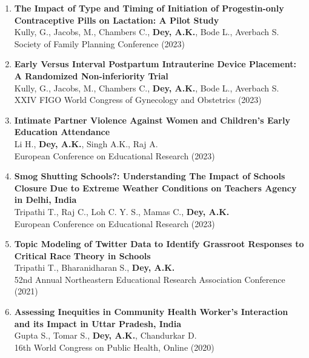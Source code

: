 \documentclass[13pt,letterpaper]{article}
\begin{document}
\begin{enumerate}
\item \textbf{The Impact of Type and Timing of Initiation of Progestin-only Contraceptive Pills on Lactation: A Pilot Study}\\
Kully, G., Jacobs, M., Chambers C., \textbf{Dey, A.K.}, Bode L., Averbach S.\\
Society of Family Planning Conference (2023) 

\item \textbf{Early Versus Interval Postpartum Intrauterine Device Placement: A Randomized Non-inferiority Trial}\\
Kully, G., Jacobs, M., Chambers C., \textbf{Dey, A.K.}, Bode L., Averbach S.\\
XXIV FIGO World Congress of Gynecology and Obstetrics (2023) 

\item \textbf{Intimate Partner Violence Against Women and Children's Early Education Attendance}\\
Li H., \textbf{Dey, A.K.}, Singh A.K., Raj A.\\
European Conference on Educational Research (2023) 

\item \textbf{Smog Shutting Schools?: Understanding The Impact of Schools Closure Due to Extreme Weather Conditions on Teachers Agency in Delhi, India}\\
Tripathi T., Raj C., Loh C. Y. S., Mamas C., \textbf{Dey, A.K.}\\
European Conference on Educational Research (2023) 

\item \textbf{Topic Modeling of Twitter Data to Identify Grassroot Responses to Critical Race Theory in Schools}\\
Tripathi T., Bharanidharan S., \textbf{Dey, A.K.}\\
52nd Annual Northeastern Educational Research Association Conference (2021) 

\item \textbf{Assessing Inequities in Community Health Worker's Interaction and its Impact in Uttar Pradesh, India}\\
Gupta S., Tomar S., \textbf{Dey, A.K.}, Chandurkar D.\\
16th World Congress on Public Health, Online (2020) 


\end{enumerate}
\end{document}
